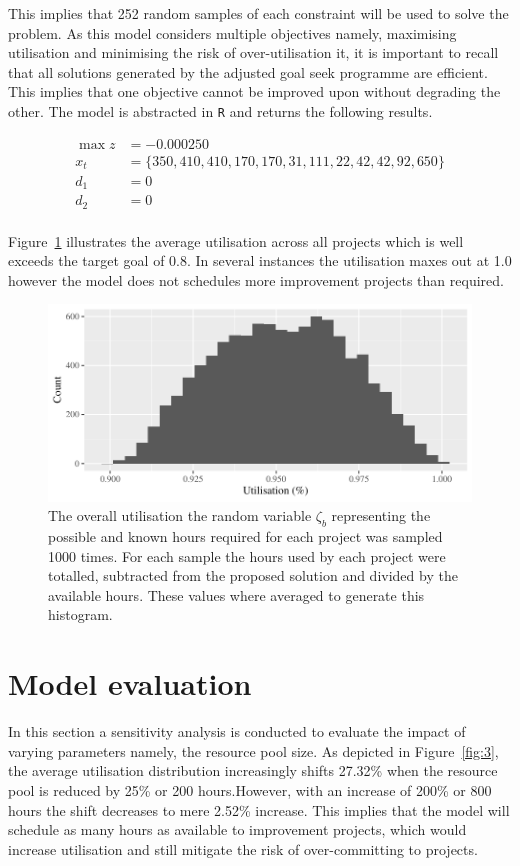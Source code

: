\documentclass[a4paper,11pt]{article}
\begin{document}
This implies that 252 random samples of each constraint will be used to solve the problem. As this model considers multiple objectives namely, maximising utilisation and minimising the risk of over-utilisation it, it is important to recall that all solutions generated by the adjusted goal seek programme are efficient. This implies that one objective cannot be improved upon without degrading the other. The model is abstracted in \texttt{R} and returns the following results.

\begin{align}
	\max z &= -0.000250\\
	x_t &= \{350, 410, 410, 170, 170,  31, 111,  22,  42,  42,  92, 650\}\\
	d_1 &= 0 \\
	d_2 &= 0 \\
\end{align}

Figure~\ref{fig:2} illustrates the average utilisation across all projects which is well exceeds the target goal of 0.8. In several instances the utilisation maxes out at 1.0 however the model does not schedules more improvement projects than required.

\begin{figure}[]
\label{fig:2}
\includegraphics[width=15cm]{../img/GGplotOverview}
\caption{The overall utilisation the random variable $\zeta_b$ representing the possible and known hours required for each project was sampled 1000 times. For each sample the hours used by each project were totalled, subtracted from the proposed solution and divided by the available hours. These values where averaged to generate this histogram.}
\end{figure}


\section{Model evaluation}
In this section a sensitivity analysis is conducted to evaluate the impact of varying parameters namely, the resource pool size.
As depicted in Figure~\ref{fig:3}, the average utilisation distribution increasingly shifts 27.32\% when the resource pool is reduced by 25\% or 200 hours.However, with an increase of 200\% or 800 hours the shift decreases to mere 2.52\% increase. This implies that the model will schedule as many hours as available to improvement projects, which would increase utilisation and still mitigate the risk of over-committing to projects. 
\end{document}
